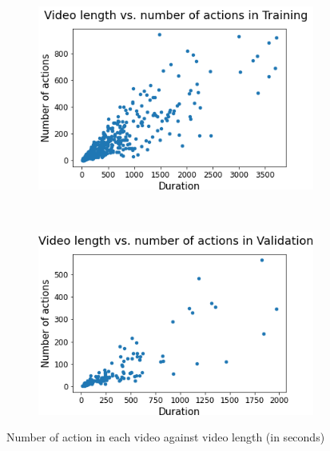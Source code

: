 \begin{figure}[t!]
        \begin{subfigure}[b]{0.475\textwidth}
            \centering
            \includegraphics[scale=0.42]{figures/length_vs_actions_Training.png}
        \end{subfigure}\\
        \begin{subfigure}[b]{0.475\textwidth}
            \centering
            \includegraphics[scale=0.42]{figures/length_vs_actions_Validation.png}
        \end{subfigure}
        \caption{Number of action in each video against video length (in seconds)}
        \label{fig:action-freq-video-length}
\end{figure}


